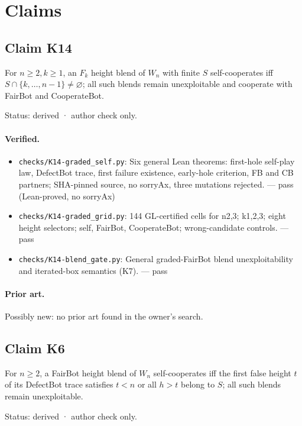 \documentclass{article}
\begin{document}
\section{Claims}

\subsection*{Claim K14}

For $n\ge2,k\ge1$, an $F_k$ height blend of $W_n$ with finite $S$ self-cooperates iff $S\cap\{k,\ldots,n-1\}\ne\varnothing$; all such blends remain unexploitable and cooperate with FairBot and CooperateBot.

Status: derived · author check only.

\paragraph{Verified.}
\begin{itemize}
\item \texttt{checks/K14-graded\_self.py}: Six general Lean theorems: first-hole self-play law, DefectBot trace, first failure existence, early-hole criterion, FB and CB partners; SHA-pinned source, no sorryAx, three mutations rejected. --- pass (Lean-proved, no sorryAx)
\item \texttt{checks/K14-graded\_grid.py}: 144 GL-certified cells for n2,3; k1,2,3; eight height selectors; self, FairBot, CooperateBot; wrong-candidate controls. --- pass
\item \texttt{checks/K14-blend\_gate.py}: General graded-FairBot blend unexploitability and iterated-box semantics (K7). --- pass
\end{itemize}

\paragraph{Prior art.} Possibly new: no prior art found in the owner's search.

\subsection*{Claim K6}

For $n\ge2$, a FairBot height blend of $W_n$ self-cooperates iff the first false height $t$ of its DefectBot trace satisfies $t<n$ or all $h>t$ belong to $S$; all such blends remain unexploitable.

Status: derived · author check only.
\end{document}
